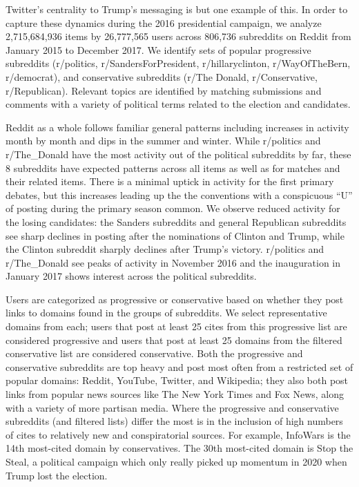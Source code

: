 \documentclass[doublespacing]{utdthesis}
\begin{document}
Twitter's centrality to Trump's messaging is but one example of this.
In order to capture these dynamics during the 2016 presidential campaign, we analyze 2,715,684,936 items by 26,777,565 users across 806,736 subreddits on Reddit from January 2015 to December 2017.
We identify sets of popular progressive subreddits (r/politics, r/SandersForPresident, r/hillaryclinton, r/WayOfTheBern, r/democrat), and conservative subreddits (r/The Donald, r/Conservative, r/Republican).
Relevant topics are identified by matching submissions and comments with a variety of political terms related to the election and candidates.

Reddit as a whole follows familiar general patterns including increases in activity month by month and dips in the summer and winter.
While r/politics and r/The\_Donald have the most activity out of the political subreddits by far, these 8 subreddits have expected patterns across all items as well as for matches and their related items.
There is a minimal uptick in activity for the first primary debates, but this increases leading up the the conventions with a conspicuous ``U'' of posting during the primary season common.
We observe reduced activity for the losing candidates: the Sanders subreddits and general Republican subreddits see sharp declines in posting after the nominations of Clinton and Trump, while the Clinton subreddit sharply declines after Trump's victory.
r/politics and r/The\_Donald see peaks of activity in November 2016 and the inauguration in January 2017 shows interest across the political subreddits.

Users are categorized as progressive or conservative based on whether they post links to domains found in the groups of subreddits.
We select representative domains from each; users that post at least 25 cites from this progressive list are considered progressive and users that post at least 25 domains from the filtered conservative list are considered conservative.
Both the progressive and conservative subreddits are top heavy and post most often from a restricted set of popular domains: Reddit, YouTube, Twitter, and Wikipedia; they also both post links from popular news sources like The New York Times and Fox News, along with a variety of more partisan media.
Where the progressive and conservative subreddits (and filtered lists) differ the most is in the inclusion of high numbers of cites to relatively new and conspiratorial sources.
For example, InfoWars is the 14th most-cited domain by conservatives.
The 30th most-cited domain is Stop the Steal, a political campaign which only really picked up momentum in 2020 when Trump lost the election.
\end{document}
